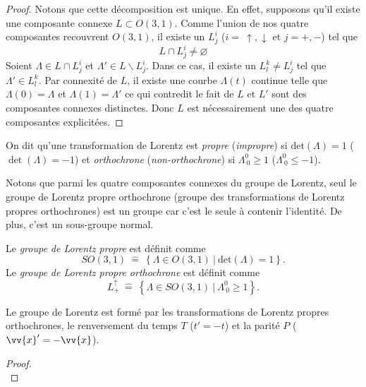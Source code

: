 \documentclass[a4paper,11pt]{report}
\begin{document}
\begin{proof}
                Notons que cette décomposition est unique. En effet, supposons qu'il existe une composante connexe $L \subset O(3, 1)$. Comme l'union de nos quatre composantes recouvrent $O(3, 1)$, il existe un $L^i_j$ ($i = ~\uparrow, \downarrow$ et $j = +, -$) tel que 
                \begin{equation}
                    L \cap L^i_j \neq \varnothing
                \end{equation}
                Soient $\Lambda \in L \cap L^i_j $ et $\Lambda' \in L\backslash L^i_j$. Dans ce cas, il existe un $L^k_l \neq L^i_j$ tel que $\Lambda' \in L^k_l$. Par connexité de $L$, il existe une courbe $\Lambda(t)$ continue telle que $\Lambda(0) = \Lambda$ et $\Lambda(1) = \Lambda'$
                ce qui contredit le fait de $L$ et $L'$ sont des composantes connexes distinctes.
                Donc $L$ est nécessairement une des quatre composantes explicitées.
            \end{proof}
            \begin{defn}
                On dit qu'une transformation de Lorentz est \textit{propre} (\textit{impropre}) si $\text{det}(\Lambda) = 1$ ($\det(\Lambda) = -1$) et \textit{orthochrone} (\textit{non-orthochrone}) si $\Lambda^0_{~0}\geq1$ ($\Lambda^0_{~0}\leq-1$). 
            \end{defn}
            Notons que parmi les quatre composantes connexes du groupe de Lorentz, seul le groupe de Lorentz propre orthochrone (groupe des transformations de Lorentz propres orthochrones) est un groupe car c'est le seule à contenir l'identité. De plus, c'est un sous-groupe normal.
            
            \begin{defn}
                Le \textit{groupe de Lorentz propre} est définit comme
                $$SO(3,1) ~\hat{=}~ \left\{\Lambda\in O(3,1)~\big|~\text{det}(\Lambda) = 1\right\}.$$
                 Le \textit{groupe de Lorentz propre orthochrone} est définit comme
                $$L^\uparrow_+ ~\hat{=}~ \left\{\Lambda\in SO(3,1)~\big|~\Lambda^0_{~0}\geq1\right\}.$$
            \end{defn}
            
            \begin{prop}\begin{leftbar}
                Le groupe de Lorentz est formé par les transformations de Lorentz propres orthochrones, le renversement du temps $T$ ($t'= -t$) et la parité $P$ ($\vv{x}' = -\vv{x}$).
            \end{leftbar}\end{prop}
            \begin{proof}${}$\\
                \comp
            \end{proof}
            
\end{document}
